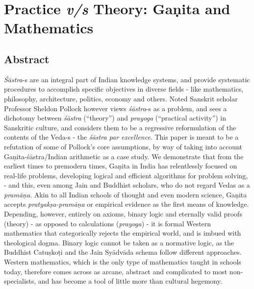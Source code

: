 \chapter[Practice {\sl  v/s} Theory: Gaṇita and...]{Practice {\sl\bfseries v/s} Theory: Gaṇita and Mathematics}\label{chapter\thechapter:begin}


\section*{Abstract}

{\sl Śāstra}-s are an integral part of Indian knowledge systems, and provide systematic procedures to accomplish specific objectives in diverse fields - like mathematics, philosophy, architecture, politics, economy and others. Noted Sanskrit scholar Professor Sheldon Pollock however views {\sl śāstra}-s as a problem, and sees a dichotomy between {\sl śāstra} (``theory'') and {\sl prayoga} (``practical activity'') in Sanskritic culture, and considers them to be a regressive reformulation of the contents of the Veda-s - the {\sl śāstra par excellence}. This paper is meant to be a refutation of some of Pollock's core assumptions, by way of taking into account Gaṇita-śāstra/Indian arithmetic as a case study. We demonstrate that from the earliest times to premodern times, Gaṇita in India has relentlessly focused on real-life problems, developing logical and efficient algorithms for problem solving, - and this, even among Jain and Buddhist scholars, who do not regard Vedas as a {\sl pramāṇa}. Akin to all Indian schools of thought and even modern science, Gaṇita accepts {\sl pratyakṣa-pramāṇa} or empirical evidence as the first means of knowledge. Depending, however, entirely on axioms, binary logic and eternally valid proofs (theory) - as opposed to calculations ({\sl prayoga}) -  it is formal Western mathematics that categorically rejects the empirical world, and is imbued with theological dogma. Binary logic cannot be taken as a normative logic, as the Buddhist Catuṣkoṭi and the Jain Syādvāda schema follow different approaches. Western mathematics, which is the only type of mathematics taught in schools today, therefore comes across as arcane, abstract and complicated to most non-specialists, and has become a tool of little more than cultural hegemony.  

